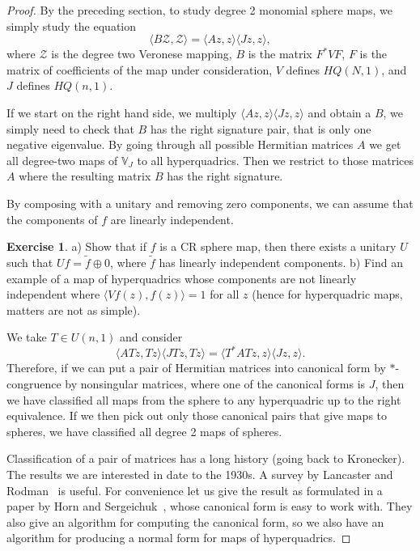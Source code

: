 \documentclass[12pt,openany]{book}
\newcommand{\bV}{{\mathbb{V}}}
\newcommand{\sZ}{{\mathcal{Z}}}
\theoremstyle{plain}
\theoremstyle{remark}
\theoremstyle{definition}
\theoremstyle{exercise}
\newtheorem{exercise}{Exercise}[section]
\theoremstyle{example}
\begin{document}
\begin{proof}
By the preceding section, to study degree 2 monomial sphere maps, we  simply
study the equation
\begin{equation}
\langle B \sZ , \sZ \rangle =
\langle A z , z \rangle
\langle J z , z \rangle ,
\end{equation}
where $\sZ$ is the degree two Veronese mapping, $B$ is the matrix
$F^* V F$, $F$ is the matrix of coefficients of the map under
consideration, $V$ defines $HQ(N,1)$, and $J$ defines $HQ(n,1)$.

If we start on the right hand side, we multiply
$\langle A z , z \rangle \langle J z , z \rangle$
and obtain a $B$, we simply need to check that $B$ has the right signature
pair, that is only one negative eigenvalue.
By going through all possible Hermitian
matrices $A$ we get all degree-two maps of $\bV_J$ to all hyperquadrics.
Then we restrict
to those matrices $A$ where the resulting matrix $B$ has the right signature.

By composing with a unitary and removing zero components,
we can assume that the components of $f$
are linearly independent.

\begin{exercise}
a) Show that if $f$ is a CR sphere map, then there exists a unitary $U$
such that $Uf = \tilde{f} \oplus 0$, where $\tilde{f}$ has linearly
independent components. b) Find an example of a map of hyperquadrics
whose components are not linearly independent where $\langle V f(z), f(z)
\rangle = 1$ for all $z$ (hence for hyperquadric maps, matters are not as
simple).
\end{exercise}

We take $T \in U(n,1)$ and consider
\begin{equation}
\langle A Tz , Tz \rangle \langle J Tz , Tz \rangle
=
\langle T^* A T z , z \rangle \langle J z , z \rangle .
\end{equation}
Therefore, if we can put a pair of Hermitian matrices into canonical form by
$*$-congruence by nonsingular matrices, where one of the canonical forms is
$J$, then we have classified all maps from the sphere
to any hyperquadric up to the right equivalence.
If we then pick out only those canonical pairs that give maps to spheres,
we have classified all degree 2 maps of spheres.

Classification of a pair of matrices has a long history (going back to
Kronecker).  The results we are interested in date to the 1930s.
A survey by Lancaster and Rodman~\cite{LancasterRodman} is useful.
For convenience let us give the result as formulated in a paper by
Horn and Sergeichuk~\cite{HornSergeichuk},
whose canonical form is easy to work with.
They also give an algorithm for computing the canonical form, so we also
have an algorithm for producing a normal form for maps of hyperquadrics.


\end{proof}
\end{document}
